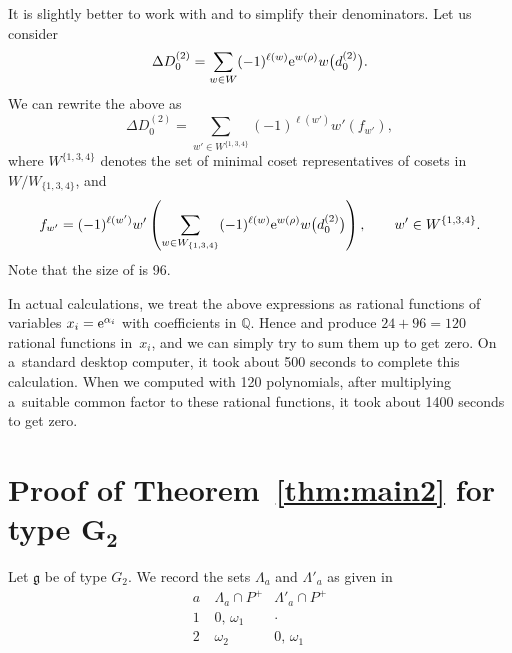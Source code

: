 \documentclass[pdftex]{sigma}
\numberwithin{equation}{section}
\theoremstyle{definition}
\newcommand{\QQ}{\mathbb{Q}}
\newcommand{\g}{\mathfrak{g}}
\begin{document}
It is slightly better to work with  and  to simplify their denominators. Let us consider
\[
\Delta D^{(2)}_{0}=\sum_{w\in W}(-1)^{\ell(w)}{\rm e}^{w(\rho)}w\bigl(d^{(2)}_{0}\bigr).
\]
We can rewrite the above as
\[%
\Delta D^{(2)}_{0}=
\sum_{w'\in W^{\{1,3,4\}}}
(-1)^{\ell(w')}
w'(f_{w'}),
\]
where $W^{\{1,3,4\}}$ denotes the set of minimal coset representatives of cosets in $W/W_{\{1,3,4\}}$,
and
\[f_{w'}=
(-1)^{\ell(w')}
w'\left(\sum_{w\in W_{\{1,3,4\}}}(-1)^{\ell(w)}{\rm e}^{w(\rho)}w\bigl(d^{(2)}_{0}\bigr)\right),\qquad w'\in W^{\{1,3,4\}}
.\]
Note that the size of  is 96.

In actual calculations, we treat the above expressions as rational functions of variables ${x_i={\rm e}^{\alpha_i}}$ with coefficients in $\QQ$.
Hence  and  produce $24+96=120$ rational functions in~$x_i$, and we can simply try to sum them up to get zero.
On a~standard desktop computer, it took about 500 seconds to complete this calculation.
When we computed with 120 polynomials, after multiplying a~suitable common factor to these rational functions, it took about 1400 seconds to get zero.

\section[Proof of Theorem~1.2 for type G\_2]{Proof of Theorem~\ref{thm:main2} for type $\boldsymbol{G_2}$}\label{sec:g2}
Let $\g$ be of type $G_2$.
We record the sets $\Lambda_a$ and $\Lambda'_a$ as given in \cite[Appendix B]{MR3948941}
\[
\begin{array}{c|c|c} a~& \Lambda_a\cap P^+ & \Lambda'_a\cap P^+\\
\hline
1 & 0,\,\omega_1 & \cdot\\
2 & \omega_2 & 0,\,\omega_1
\end{array}
\]
\end{document}
